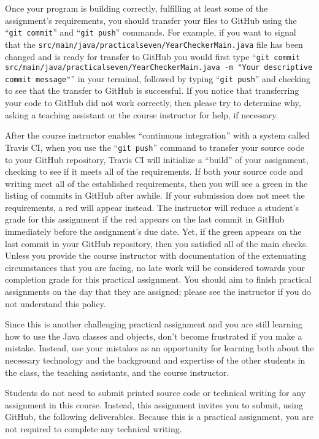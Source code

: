 \documentclass[11pt]{article}
\newcommand{\mainprogramsource}{\lstinline{src/main/java/practicalseven/YearCheckerMain.java}}
\newcommand{\gitcommit}{\command{git commit}}
\newcommand{\gitpush}{\command{git push}}
\newcommand{\gitcommitmainprogram}{\command{git commit src/main/java/practicalseven/YearCheckerMain.java -m "Your
descriptive commit message"}}
\newcommand{\command}[1]{``\lstinline{#1}''}
\newcommand{\step}[1]{``{#1}''}
\newcommand{\checkmark}{\ding{51}}
\newcommand{\naughtmark}{\ding{55}}
\begin{document}
Once your program is building correctly, fulfilling at least some of the
assignment's requirements, you should transfer your files to GitHub using the
\gitcommit{} and \gitpush{} commands. For example, if you want to signal that
the \mainprogramsource{} file has been changed and is ready for transfer to
GitHub you would first type \gitcommitmainprogram{} in your terminal, followed
by typing \gitpush{} and checking to see that the transfer to GitHub is
successful. If you notice that transferring your code to GitHub did not work
correctly, then please try to determine why, asking a teaching assistant or the
course instructor for help, if necessary.

After the course instructor enables \step{continuous integration} with a system
called Travis CI, when you use the \gitpush{} command to transfer your source
code to your GitHub repository, Travis CI will initialize a \step{build} of your
assignment, checking to see if it meets all of the requirements. If both your
source code and writing meet all of the established requirements, then you will
see a green \checkmark{} in the listing of commits in GitHub after awhile. If
your submission does not meet the requirements, a red \naughtmark{} will appear
instead. The instructor will reduce a student's grade for this assignment if the
red \naughtmark{} appears on the last commit in GitHub immediately before the
assignment's due date. Yet, if the green \checkmark{} appears on the last commit
in your GitHub repository, then you satisfied all of the main checks. Unless you
provide the course instructor with documentation of the extenuating
circumstances that you are facing, no late work will be considered towards your
completion grade for this practical assignment. You should aim to finish
practical assignments on the day that they are assigned; please see the
instructor if you do not understand this policy.

Since this is another challenging practical assignment and you are still
learning how to use the Java classes and objects, don't become frustrated if you
make a mistake. Instead, use your mistakes as an opportunity for learning both
about the necessary technology and the background and expertise of the other
students in the class, the teaching assistants, and the course instructor.

\noindent Students do not need to submit printed source code or technical
writing for any assignment in this course. Instead, this assignment invites you
to submit, using GitHub, the following deliverables. Because this is a practical
assignment, you are not required to complete any technical writing.
\end{document}
